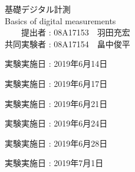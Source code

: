 \documentclass[11pt, a4paper,twocolumn]{jarticle}
\begin{document}
\begin{titlepage}
  \begin{center}
    {\Huge 基礎デジタル計測}\\
    \vspace{10truept}
    {\Huge Basics of digital measurements}\\
    \vspace{30truept}
    {\huge 　　提出者 : 08A17153　羽田充宏}\\ %
    {\huge 共同実験者 : 08A17154　畠中俊平}\\ %
    \vspace{50truept}

    \begin{list}{}{\setlength{\leftmargin}{95pt}}
    \item {\huge 実験実施日 : 2019年6月14日}\\
    \vspace{10truept}
    \item {\huge 実験実施日 : 2019年6月17日}\\
    \vspace{10truept}
    \item {\huge 実験実施日 : 2019年6月21日}\\
    \vspace{10truept}
    \item {\huge 実験実施日 : 2019年6月24日}\\
    \vspace{10truept}
    \item {\huge 実験実施日 : 2019年6月28日}\\
    \vspace{10truept}
    \item {\huge 実験実施日 : 2019年7月1日}\\
    \vspace{40truept}

    \end{list}
    \vspace{50truept}

  \end{center}
\end{titlepage}
\end{document}
